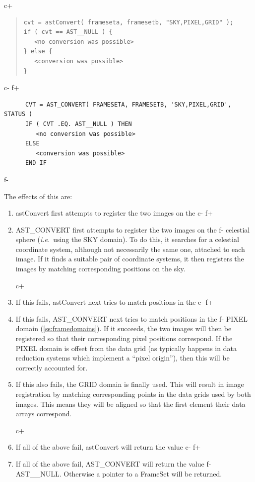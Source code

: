 \documentclass[twoside,11pt]{article}
\newcommand{\secref}[1]{\S\ref{#1}}
\renewcommand{\secref}[1]{\ref{#1}}
\begin{document}
c+
\begin{quote}
\small
\begin{verbatim}
cvt = astConvert( frameseta, framesetb, "SKY,PIXEL,GRID" );
if ( cvt == AST__NULL ) {
   <no conversion was possible>
} else {
   <conversion was possible>
}
\end{verbatim}
\normalsize
\end{quote}
c-
f+
\small
\begin{verbatim}
      CVT = AST_CONVERT( FRAMESETA, FRAMESETB, 'SKY,PIXEL,GRID', STATUS )
      IF ( CVT .EQ. AST__NULL ) THEN
         <no conversion was possible>
      ELSE
         <conversion was possible>
      END IF
\end{verbatim}
\normalsize
f-

The effects of this are:

\begin{enumerate}
c+
\item astConvert first attempts to register the two images on the
c-
f+
\item AST\_CONVERT first attempts to register the two images on the
f-
celestial sphere ({\em{i.e.}}\ using the SKY domain). To do this, it
searches for a celestial coordinate system, although not necessarily
the same one, attached to each image.  If it finds a suitable pair of
coordinate systems, it then registers the images by matching
corresponding positions on the sky.

c+
\item If this fails, astConvert next tries to match positions in the
c-
f+
\item If this fails, AST\_CONVERT next tries to match positions in the
f-
PIXEL domain (\secref{ss:framedomains}). If it succeeds, the two
images will then be registered so that their corresponding pixel
positions correspond. If the PIXEL domain is offset from the data grid
(as typically happens in data reduction systems which implement a
``pixel origin''), then this will be correctly accounted for.

\item If this also fails, the GRID domain is finally used. This will
result in image registration by matching corresponding points in the
data grids used by both images. This means they will be
aligned so that the first element their data arrays correspond.

c+
\item If all of the above fail, astConvert will return the value
c-
f+
\item If all of the above fail, AST\_CONVERT will return the value
f-
AST\_\_NULL. Otherwise a pointer to a FrameSet will be returned.
\end{enumerate}
\end{document}

